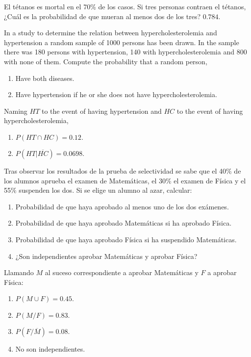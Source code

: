{El tétanos es mortal en el 70\% de los casos.
Si tres personas contraen el tétanos, ¿Cuál es la probabilidad de que mueran al menos dos de los tres?
}
{$0.784$.}
{}


{In a study to determine the relation between hypercholesterolemia and hypertension a random sample of 1000 persons has been drawn.
In the sample there was 180 persons with hypertension, 140 with hypercholesterolemia and 800 with none of them. 
Compute the probability that a random person, 
\begin{enumerate}
\item Have both diseases. 
\item Have hypertension if he or she does not have hypercholesterolemia.
\end{enumerate}
}
{Naming $HT$ to the event of having hypertension and $HC$ to the event of having hypercholesterolemia,
\begin{enumerate}
\item $P(HT\cap HC)=0.12.$
\item $P(HT|\overline{HC})=0.0698.$
\end{enumerate} 
}
{}


{Tras observar los resultados de la prueba de selectividad se sabe que el 40\% de los alumnos aprueba el examen de
Matemáticas, el 30\% el examen de Física y el 55\% suspenden los dos.
Si se elige un alumno al azar, calcular:
\begin{enumerate}
\item Probabilidad de que haya aprobado al menos uno de los dos exámenes.
\item Probabilidad de que haya aprobado Matemáticas si ha aprobado Física.
\item Probabilidad de que haya aprobado Física si ha suspendido Matemáticas.
\item ¿Son independientes aprobar Matemáticas y aprobar Física?
\end{enumerate}
}
{Llamando $M$ al suceso correspondiente a aprobar Matemáticas y $F$ a aprobar Física:
\begin{enumerate}
\item $P(M\cup F)=0.45$.
\item $P(M/F)=0.83$.
\item $P(F/\overline{M})=0.08$.
\item No son independientes.
\end{enumerate}
}
{}


